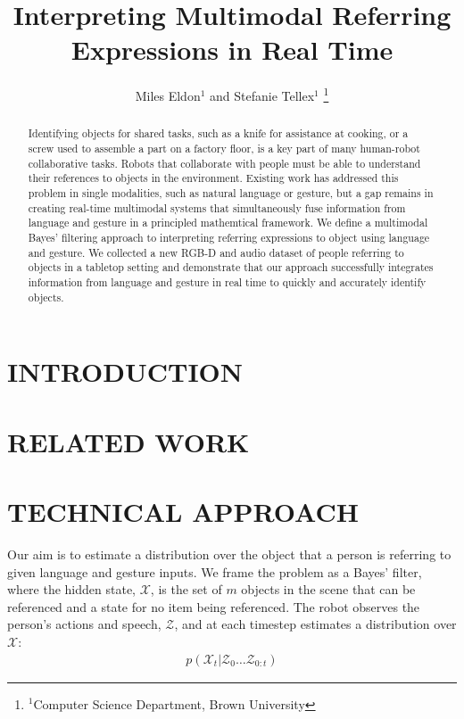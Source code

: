 \documentclass[letterpaper, 10 pt, conference]{ieeeconf}
\title{\LARGE \bf
Interpreting Multimodal Referring Expressions in Real Time}
\author{Miles Eldon$^{1}$ and Stefanie Tellex$^{1}$
\thanks{$^{1}$Computer Science Department, Brown University}
}
\begin{document}
\maketitle
\thispagestyle{empty}
\pagestyle{empty}

\begin{abstract}
Identifying objects for shared tasks, such as a knife for assistance
at cooking, or a screw used to assemble a part on a factory floor, is
a key part of many human-robot collaborative tasks.  Robots that
collaborate with people must be able to understand their references to
objects in the environment.  Existing work has addressed this problem
in single modalities, such as natural language or gesture, but a gap
remains in creating real-time multimodal systems that simultaneously
fuse information from language and gesture in a principled mathemtical
framework.  We define a multimodal Bayes' filtering approach to
interpreting referring expressions to object using language and
gesture.  We collected a new RGB-D and audio dataset of people
referring to objects in a tabletop setting and demonstrate that our
approach successfully integrates information from language and gesture
in real time to quickly and accurately identify objects.
\end{abstract}

\section{INTRODUCTION}

\section{RELATED WORK}


\citep{matuszek12}

\section{TECHNICAL APPROACH}
Our aim is to estimate a distribution over the object that a person is
referring to given language and gesture inputs.  We frame the problem
as a Bayes' filter, where the hidden state, $\mathcal{X}$, is the set
of $m$ objects in the scene that can be referenced and a state for no
item being referenced.  The robot observes the person's actions and
speech, $\mathcal{Z}$, and at each timestep estimates a distribution
over $\mathcal{X}$:
\begin{align}
  p(\mathcal{X}_t | \mathcal{Z}_0 \dots \mathcal{Z}_{0:t})
\end{align}
\end{document}
